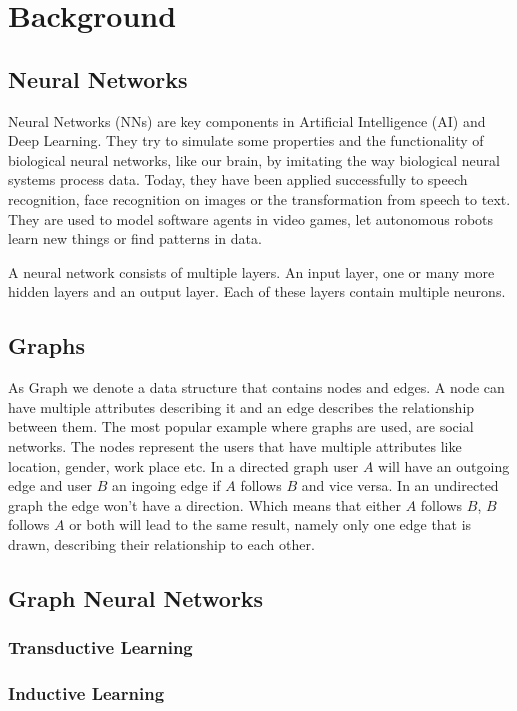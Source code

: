 \chapter{Background}

  \section{Neural Networks}

    Neural Networks (NNs) are key components in Artificial Intelligence (AI) and Deep Learning.
    They try to simulate some properties and the functionality of biological neural networks, like our brain, by imitating the way biological neural systems process data.
    Today, they have been applied successfully to speech recognition, face recognition on images or the transformation from speech to text.
    They are used to model software agents in video games, let autonomous robots learn new things or find patterns in data.

    A neural network consists of multiple layers.
    An input layer, one or many more hidden layers and an output layer.
    Each of these layers contain multiple neurons.


	\section{Graphs}

		As Graph we denote a data structure that contains nodes and edges. A node can have multiple attributes describing it and an edge describes the relationship between them. The most popular example where graphs are used, are social networks. The nodes represent the users that have multiple attributes like location, gender, work place etc. In a directed graph user $A$ will have an outgoing edge and user $B$ an ingoing edge if $A$ follows $B$ and vice versa. In an undirected graph the edge won't have a direction. Which means that either $A$ follows $B$, $B$ follows $A$ or both will lead to the same result, namely only one edge that is drawn, describing their relationship to each other.

	\section{Graph Neural Networks}
      

    \subsection{Transductive Learning}

    \subsection{Inductive Learning}
